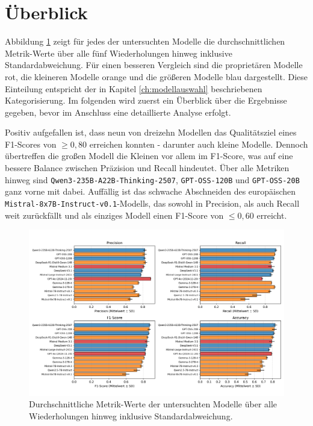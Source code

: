 \section{Überblick}\label{sec:analyse}

Abbildung \ref{fig:results-evaluation-metrics-comparison} zeigt für jedes der untersuchten Modelle die durchschnittlichen Metrik-Werte über alle fünf Wiederholungen hinweg inklusive Standardabweichung. Für einen besseren Vergleich sind die proprietären Modelle rot, die kleineren Modelle orange und die größeren Modelle blau dargestellt. Diese Einteilung entspricht der in Kapitel \ref{ch:modellauswahl} beschriebenen Kategorisierung. Im folgenden wird zuerst ein Überblick über die Ergebnisse gegeben, bevor im Anschluss eine detaillierte Analyse erfolgt.

Positiv aufgefallen ist, dass neun von dreizehn Modellen das Qualitätsziel eines F1-Scores von $\geq 0{,}80$ erreichen konnten - darunter auch kleine Modelle. Dennoch übertreffen die großen Modell die Kleinen vor allem im F1-Score, was auf eine bessere Balance zwischen Präzision und Recall hindeutet. Über alle Metriken hinweg sind \texttt{Qwen3-235B-A22B-Thinking-2507}, \texttt{GPT-OSS-120B} und \texttt{GPT-OSS-20B} ganz vorne mit dabei. Auffällig ist das schwache Abschneiden des europäischen \texttt{Mistral-8x7B-Instruct-v0.1}-Modells, das sowohl in Precision, als auch Recall weit zurückfällt und als einziges Modell einen F1-Score von $\le 0{,}60$ erreicht.

\begin{figure}[htbp]
    \centering
    \includegraphics[width=\textwidth,trim=20 40 20 10,clip]{images/results/evaluation_metrics_comparison}
    \caption{Durchschnittliche Metrik-Werte der untersuchten Modelle über alle Wiederholungen hinweg inklusive Standardabweichung.}
    \label{fig:results-evaluation-metrics-comparison}
\end{figure}

